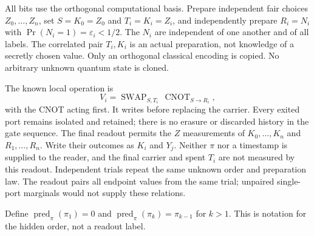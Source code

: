 \documentclass[12pt,a4paper]{article}
\begin{document}
All bits use the orthogonal computational basis. Prepare independent
fair choices $Z_0,\ldots,Z_n$, set $S=K_0=Z_0$ and
$T_i=K_i=Z_i$, and independently prepare
$R_i=N_i$ with $\Pr(N_i=1)=\varepsilon_i<1/2$.
The $N_i$ are independent of one another and of all labels.
The correlated pair $T_i,K_i$ is an actual preparation, not knowledge
of a secretly chosen value. Only an orthogonal classical encoding
is copied. No arbitrary unknown quantum state is cloned.

The known local operation is
\begin{equation}
 V_i=\operatorname{SWAP}_{S,T_i}\,
                    \operatorname{CNOT}_{S\to R_i},
 \label{eq:station-gate}
\end{equation}
with the CNOT acting first. It writes before replacing the carrier.
Every exited port remains isolated and retained; there is no erasure
or discarded history in the gate sequence. The final readout permits
the $Z$ measurements of $K_0,\ldots,K_n$ and $R_1,\ldots,R_n$.
Write their outcomes as $K_i$ and $Y_j$.
Neither $\pi$ nor a timestamp is supplied to the reader, and
the final carrier and spent $T_i$ are not measured by this readout.
Independent trials repeat the same unknown order and preparation law.
The readout pairs all endpoint values from the same trial; unpaired
single-port marginals would not supply these relations.

Define $\operatorname{pred}_\pi(\pi_1)=0$ and
$\operatorname{pred}_\pi(\pi_k)=\pi_{k-1}$ for $k>1$.
This is notation for the hidden order, not a readout label.
\end{document}
